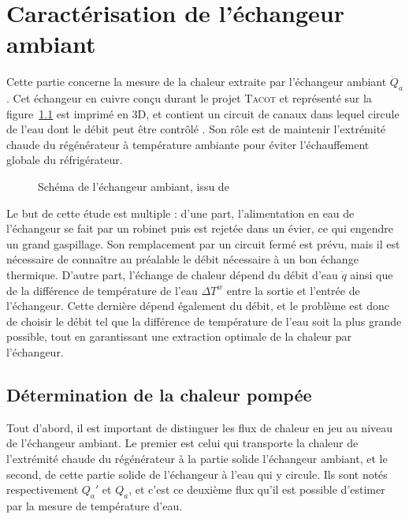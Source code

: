 \chapter{Caractérisation de l'échangeur ambiant}\label{chap:AHX}
Cette partie concerne la mesure de la chaleur extraite par l'échangeur ambiant $\dot Q_a$. Cet échangeur en cuivre conçu durant le projet \textsc{Tacot} et représenté sur la figure~\ref{fig:AHXschema} est imprimé en 3D, et contient un circuit de canaux dans lequel circule de l'eau dont le débit peut être contrôlé \cite{ANR_thermo-acoustic_2019, ramadan_design_2021}. Son rôle est de maintenir l'extrémité chaude du régénérateur à température ambiante pour éviter l'échauffement globale du réfrigérateur. 

\begin{figure}[!ht]
    \centering
    
    \caption{Schéma de l'échangeur ambiant, issu de \cite{ramadan_design_2021}}
    \label{fig:AHXschema}
\end{figure}

Le but de cette étude est multiple : d'une part, l'alimentation en eau de l'échangeur se fait par un robinet puis est rejetée dans un évier, ce qui engendre un grand gaspillage. Son remplacement par un circuit fermé est prévu, mais il est nécessaire de connaître au préalable le débit nécessaire à un bon échange thermique. D'autre part, l'échange de chaleur dépend du débit d'eau $\dot q$ ainsi que de la différence de température de l'eau $\Delta T^w$ entre la sortie et l'entrée de l'échangeur. Cette dernière dépend également du débit, et le problème est donc de choisir le débit tel que la différence de température de l'eau soit la plus grande possible, tout en garantissant une extraction optimale de la chaleur par l'échangeur.

\section{Détermination de la chaleur pompée}
Tout d'abord, il est important de distinguer les flux de chaleur en jeu au niveau de l'échangeur ambiant. Le premier est celui qui transporte la chaleur de l'extrémité chaude du régénérateur à la partie solide l'échangeur ambiant, et le second, de cette partie solide de l'échangeur à l'eau qui y circule. Ils sont notés respectivement $Q_a'$ et $Q_a$, et c'est ce deuxième flux qu'il est possible d'estimer par la mesure de température d'eau.\smallskip

